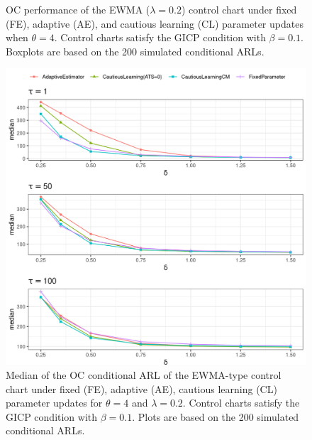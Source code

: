 \begin{figure}
\begin{subfigure}{0.49\textwidth}
\end{subfigure}
  \caption{OC performance of the EWMA ($ \lambda = 0.2$) control chart under fixed (FE), adaptive (AE), and cautious learning (CL) parameter updates when $ \theta = 4$.
    Control charts satisfy the GICP condition  with $ \beta = 0.1$.
  Boxplots are based on the 200 simulated conditional ARLs.}
  \label{fig:lambda=0.20/EWMA OC theta=4}
\end{figure}

\begin{figure}
  \includegraphics[width=\textwidth]{img/sims/theta=4.0_signedEWMA(l = 0.2, upw = true, L = 1.0)/OC-profiles.png}
  \caption{Median of the OC conditional ARL of the EWMA-type control chart under fixed (FE), adaptive (AE), cautious learning (CL) parameter updates for $ \theta = 4$ and $ \lambda = 0.2$.
    Control charts satisfy the GICP condition  with $ \beta = 0.1$.
  Plots are based on the 200 simulated conditional ARLs.}
  \label{fig:lambda=0.20/EWMA OC profiles}
\end{figure}
